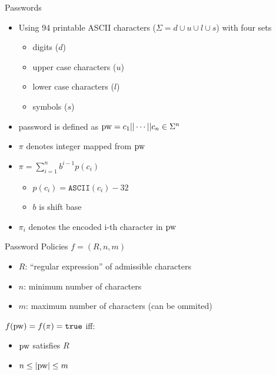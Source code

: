 \documentclass[notes,xcolor=dvipsnames]{beamer}
\begin{document}
\begin{frame}{Passwords}
  
\begin{itemize}
  \item Using 94 printable ASCII characters ($\Sigma=d\cup u \cup l \cup s$) with four sets
  \begin{itemize}
    \item digits ($d$)
    \item upper case characters ($u$)
    \item lower case characters ($l$)
    \item symbols ($s$)
  \end{itemize}
  \item password is defined as $\mathrm{pw}=c_1 || \cdots || c_n\in\Sigma^n$
\end{itemize}

\begin{itemize}
  \item $\pi$ denotes integer mapped from $\mathrm{pw}$
  \item $\pi=\sum_{i=1}^n b^{i-1}p(c_i)$
  \begin{itemize}
    \item $p(c_i)=\texttt{ASCII}(c_i)-32$
    \item $b$ is shift base
  \end{itemize}
  \item $\pi_i$ denotes the encoded i-th character in $\mathrm{pw}$
\end{itemize}

\end{frame}

\begin{frame}{Password Policies}
   $f=(R, n, m)$
  \begin{itemize}
    \item $R$: ``regular expression'' of admissible characters
    \item $n$: minimum number of characters
    \item $m$: maximum number of characters (can be ommited)
  \end{itemize}
  
  \vspace*{2em}
  $f(\mathrm{pw})=f(\pi)=\mathtt{true}$ iff:
  \begin{itemize}
    \item $\mathrm{pw}$ satisfies $R$
    \item $n\leq |\mathrm{pw}| \leq m$
  \end{itemize}
\end{frame}
\end{document}
